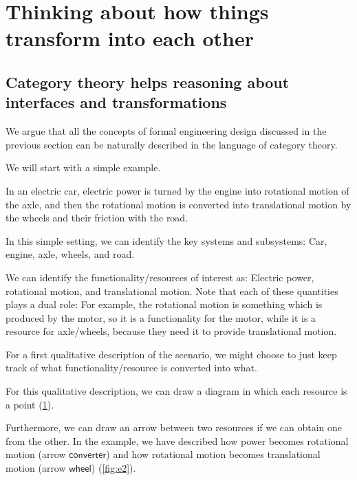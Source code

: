 \section{Thinking about how things transform into each other}

\subsection{Category theory helps reasoning about interfaces and transformations}

We argue that all the concepts of formal engineering design discussed in the
previous section can be naturally described in the language of category theory.

We will start with a simple example.

In an electric car, electric power is turned by the engine into rotational
motion of the axle, and then the rotational motion is converted into
translational motion by the wheels and their friction with the road.

In this simple setting, we can identify the key systems and subsystems: Car,
engine, axle, wheels, and road.

We can identify the functionality/resources of interest as: Electric
power, rotational motion, and translational motion. Note that each of these quantities
plays a dual role: For example, the rotational motion is something which is
produced by the motor, so it is a functionality for the motor, while it
is a resource for axle/wheels, because they need it to provide translational motion.

For a first qualitative description of the scenario, we might choose to just
keep track of what functionality/resource is converted into what.

For this qualitative description, we can draw a diagram in which each resource
is a point (\cref{fig:e1}).

\begin{figure}[h!]
    \centering
    \caption{\label{fig:e1}}
\end{figure}

Furthermore, we can draw an arrow between two resources if we can obtain one
from the other. In the example, we have described how power becomes rotational
motion (arrow $\mathsf{converter}$) and how rotational motion becomes translational motion
(arrow $\mathsf{wheel}$) (\cref{fig:e2}).

